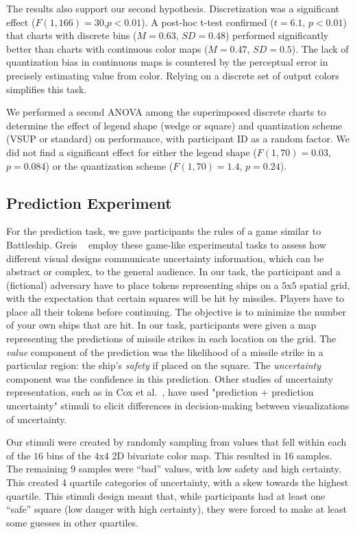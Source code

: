 The results also support our second hypothesis. Discretization was a significant effect ($F(1,166)=30$,$p<0.01$). A post-hoc t-test confirmed ($t=6.1$, $p<0.01$) that charts with discrete bins ($M=0.63$, $SD=0.48$) performed significantly better than charts with continuous color maps ($M=0.47$, $SD=0.5$). The lack of quantization bias in continuous maps is countered by the perceptual error in precisely estimating value from color. Relying on a discrete set of output colors simplifies this task.

We performed a second ANOVA among the superimposed discrete charts to determine the effect of legend shape (wedge or square) and quantization scheme (VSUP or standard) on performance, with participant ID as a random factor. We did not find a significant effect for either the legend shape ($F(1,70)=0.03$, $p=0.084$) or the quantization scheme ($F(1,70)=1.4$, $p=0.24$).

\subsection{Prediction Experiment}

\taskTwoFig

For the prediction task, we gave participants the rules of a game similar to Battleship. Greis \ea~\cite{greis2016decision} employ these game-like experimental tasks to assess how different visual designs communicate uncertainty information, which can be abstract or complex, to the general audience. In our task, the participant and a (fictional) adversary have to place tokens representing ships on a $5$x$5$ spatial grid, with the expectation that certain squares will be hit by missiles. Players have to place all their tokens before continuing. The objective is to minimize the number of your own ships that are hit. In our task, participants were given a map representing the predictions of missile strikes in each location on the grid. The \emph{value} component of the prediction was the likelihood of a missile strike in a particular region: the ship's \emph{safety} if placed on the square. The \emph{uncertainty} component was the confidence in this prediction. Other studies of uncertainty representation, such as in Cox et al.~\cite{cox2013visualizing}, have used "prediction + prediction uncertainty" stimuli to elicit differences in decision-making between visualizations of uncertainty.

Our stimuli were created by randomly sampling from values that fell within each of the $16$ bins of the $4$x$4$ 2D bivariate color map. This resulted in 16 samples. The remaining 9 samples were ``bad'' values, with low safety and high certainty. This created 4 quartile categories of uncertainty, with a skew towards the highest quartile. This stimuli design meant that, while participants had at least one ``safe'' square (low danger with high certainty), they were forced to make at least some guesses in other quartiles.

